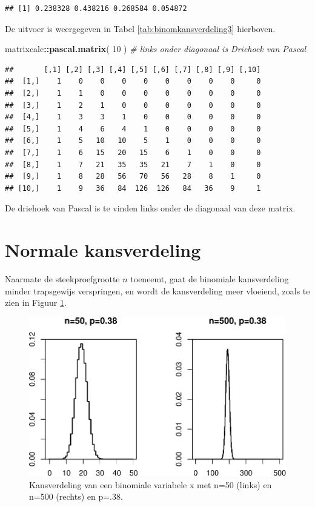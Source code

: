 \documentclass[
]{book}
\newenvironment{Shaded}{\begin{snugshade}}{\end{snugshade}}
\newcommand{\CommentTok}[1]{\textcolor[rgb]{0.56,0.35,0.01}{\textit{#1}}}
\newcommand{\DecValTok}[1]{\textcolor[rgb]{0.00,0.00,0.81}{#1}}
\newcommand{\KeywordTok}[1]{\textcolor[rgb]{0.13,0.29,0.53}{\textbf{#1}}}
\newcommand{\NormalTok}[1]{#1}
\newcommand{\OperatorTok}[1]{\textcolor[rgb]{0.81,0.36,0.00}{\textbf{#1}}}
\begin{document}
\begin{verbatim}
## [1] 0.238328 0.438216 0.268584 0.054872
\end{verbatim}

De uitvoer is weergegeven in Tabel \ref{tab:binomkansverdeling3} hierboven.

\begin{Shaded}
\begin{Highlighting}[]
\NormalTok{matrixcalc}\OperatorTok{::}\KeywordTok{pascal.matrix}\NormalTok{( }\DecValTok{10}\NormalTok{ ) }\CommentTok{\# links onder diagonaal is Driehoek van Pascal}
\end{Highlighting}
\end{Shaded}

\begin{verbatim}
##       [,1] [,2] [,3] [,4] [,5] [,6] [,7] [,8] [,9] [,10]
##  [1,]    1    0    0    0    0    0    0    0    0     0
##  [2,]    1    1    0    0    0    0    0    0    0     0
##  [3,]    1    2    1    0    0    0    0    0    0     0
##  [4,]    1    3    3    1    0    0    0    0    0     0
##  [5,]    1    4    6    4    1    0    0    0    0     0
##  [6,]    1    5   10   10    5    1    0    0    0     0
##  [7,]    1    6   15   20   15    6    1    0    0     0
##  [8,]    1    7   21   35   35   21    7    1    0     0
##  [9,]    1    8   28   56   70   56   28    8    1     0
## [10,]    1    9   36   84  126  126   84   36    9     1
\end{verbatim}

De driehoek van Pascal is te vinden links onder de diagonaal van deze matrix.

\hypertarget{sec:normaalverdeling}{%
\section{Normale kansverdeling}\label{sec:normaalverdeling}}

Naarmate de steekproefgrootte \(n\) toeneemt, gaat de binomiale
kansverdeling minder trapsgewijs verspringen, en wordt de kansverdeling
meer vloeiend, zoals te zien in
Figuur \ref{fig:binomkansverdeling50n500}.

\begin{figure}
\centering
\includegraphics{KMS-NL_files/figure-latex/binomkansverdeling50n500-1.pdf}
\caption{\label{fig:binomkansverdeling50n500}Kansverdeling van een binomiale variabele x met n=50 (links) en n=500 (rechts) en p=.38.}
\end{figure}
\end{document}
